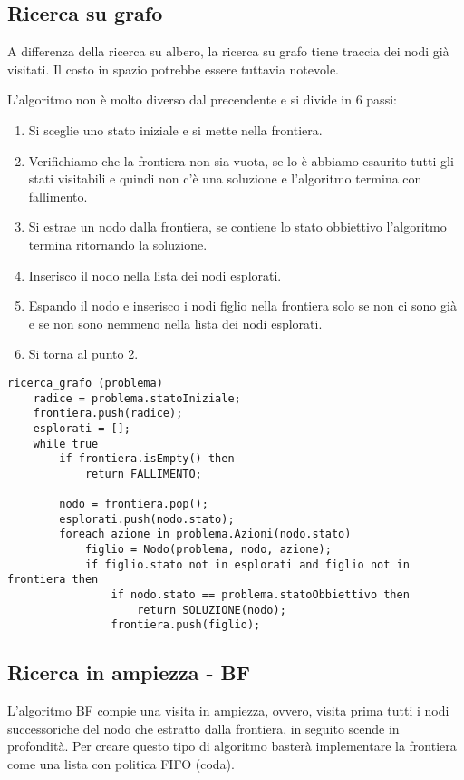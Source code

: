 \subsection{Ricerca su grafo}
A differenza della ricerca su albero, la ricerca su grafo tiene traccia dei nodi gi\`a
visitati. Il costo in spazio potrebbe essere tuttavia notevole.

L'algoritmo non \`e molto diverso dal precendente e si divide in 6 passi:
\begin{enumerate}
	\item Si sceglie uno stato iniziale e si mette nella frontiera.
	\item Verifichiamo che la frontiera non sia vuota, se lo \`e abbiamo esaurito tutti gli
	      stati visitabili e quindi non c'\`e una soluzione e l'algoritmo termina con
	      fallimento.
	\item Si estrae un nodo dalla frontiera, se contiene lo stato obbiettivo l'algoritmo
	      termina ritornando la soluzione.
	\item Inserisco il nodo nella lista dei nodi esplorati.
	\item Espando il nodo e inserisco i nodi figlio nella frontiera solo se non ci sono gi\`a
	      e se non sono nemmeno nella lista dei nodi esplorati.
	\item Si torna al punto 2.
\end{enumerate}

\begin{lstlisting}[style=pseudo-style]
ricerca_grafo (problema)
	radice = problema.statoIniziale;
	frontiera.push(radice);
	esplorati = [];
	while true
		if frontiera.isEmpty() then
			return FALLIMENTO;
		
		nodo = frontiera.pop();
		esplorati.push(nodo.stato);
		foreach azione in problema.Azioni(nodo.stato)
			figlio = Nodo(problema, nodo, azione);
			if figlio.stato not in esplorati and figlio not in frontiera then
				if nodo.stato == problema.statoObbiettivo then
					return SOLUZIONE(nodo);
				frontiera.push(figlio);
\end{lstlisting}

\subsection{Ricerca in ampiezza - BF}
L'algoritmo BF compie una visita in ampiezza, ovvero, visita prima tutti i nodi
successoriche del nodo che estratto dalla frontiera, in seguito scende in profondit\`a.
Per creare questo tipo di algoritmo baster\`a implementare la frontiera come una lista
con politica FIFO (coda).

